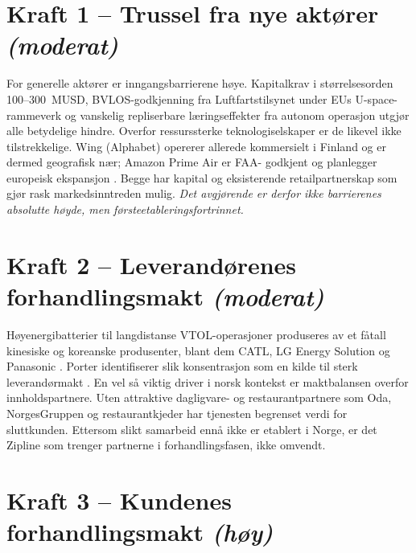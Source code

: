 \documentclass[12pt, a4paper]{article}
\begin{document}
\section{Kraft 1 – Trussel fra nye aktører \normalfont\textit{(moderat)}}

For generelle aktører er inngangsbarrierene høye. Kapitalkrav i
størrelsesorden
100--300~MUSD, BVLOS-godkjenning fra Luftfartstilsynet under EUs U-space-%
rammeverk
\parencite{luftfartstilsynet2023} og vanskelig repliserbare læringseffekter
fra autonom
operasjon \parencite[7]{porter1980} utgjør alle betydelige hindre. Overfor
ressurssterke
teknologiselskaper er de likevel ikke tilstrekkelige. Wing (Alphabet) opererer
allerede
kommersielt i Finland og er dermed geografisk nær; Amazon Prime Air er FAA-%
godkjent og
planlegger europeisk ekspansjon \parencite{wing2024, amazonair2024}. Begge har
kapital og
eksisterende retailpartnerskap som gjør rask markedsinntreden mulig.
\textit{Det avgjørende er derfor ikke barrierenes absolutte høyde, men
førsteetableringsfortrinnet.}

\section{Kraft 2 – Leverandørenes forhandlingsmakt
\normalfont\textit{(moderat)}}

Høyenergibatterier til langdistanse VTOL-operasjoner produseres av et fåtall
kinesiske og koreanske produsenter, blant dem CATL, LG Energy Solution og
Panasonic
\parencite{bloombergnef2024}. Porter identifiserer slik konsentrasjon som en
kilde til
sterk leverandørmakt \parencite[27]{porter1980}. En vel så viktig driver i
norsk kontekst
er maktbalansen overfor innholdspartnere. Uten attraktive dagligvare- og
restaurantpartnere som Oda, NorgesGruppen og restaurantkjeder har tjenesten
begrenset
verdi for sluttkunden. Ettersom slikt samarbeid ennå ikke er etablert i Norge,
er det
Zipline som trenger partnerne i forhandlingsfasen, ikke omvendt.

\section{Kraft 3 – Kundenes forhandlingsmakt \normalfont\textit{(høy)}}
\end{document}
